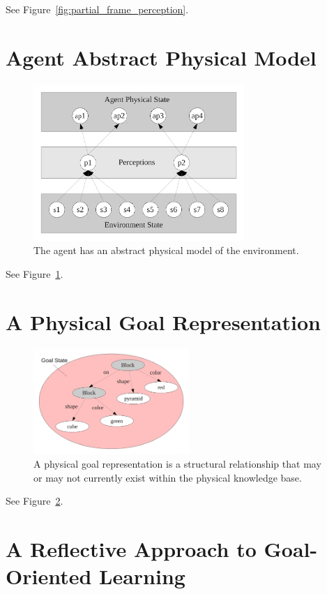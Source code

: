 See Figure~\ref{fig:partial_frame_perception}.


\section{Agent Abstract Physical Model}

\begin{figure}[bth]
  \center
  \includegraphics[width=8cm]{gfx/environment_perception_physical}
  \caption[The agent has an abstract physical model of the
    environment.]{The agent has an abstract physical model of the
    environment.}
  \label{fig:environment_perception_physical}
\end{figure}

See Figure~\ref{fig:environment_perception_physical}.


\section{A Physical Goal Representation}

\begin{figure}[bth]
  \center
  \includegraphics[height=4cm]{gfx/goal_state}
  \caption[A physical goal representation]{A physical goal
    representation is a structural relationship that may or may not
    currently exist within the physical knowledge base.}
  \label{fig:goal_state}
\end{figure}

See Figure~\ref{fig:goal_state}.


\section{A Reflective Approach to Goal-Oriented Learning}

